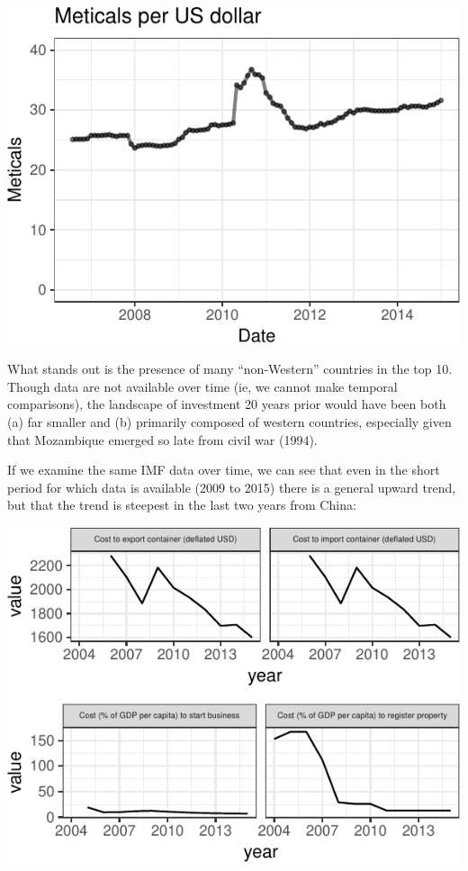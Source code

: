\documentclass[]{elsarticle} %
\begin{document}
\begin{center}\includegraphics{paper_files/figure-latex/unnamed-chunk-6-1} \end{center}

What stands out is the presence of many ``non-Western'' countries in the
top 10. Though data are not available over time (ie, we cannot make
temporal comparisons), the landscape of investment 20 years prior would
have been both (a) far smaller and (b) primarily composed of western
countries, especially given that Mozambique emerged so late from civil
war (1994).

If we examine the same IMF data over time, we can see that even in the
short period for which data is available (2009 to 2015) there is a
general upward trend, but that the trend is steepest in the last two
years from China:

\begin{center}\includegraphics{paper_files/figure-latex/unnamed-chunk-7-1} \end{center}
\end{document}
